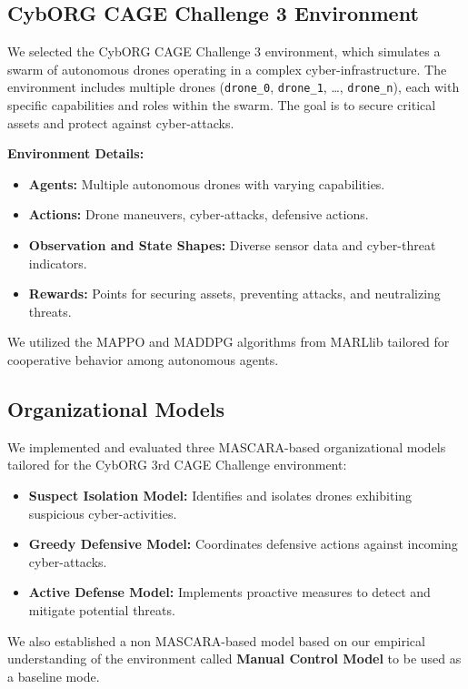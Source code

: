 \documentclass[conference]{IEEEtran}
\begin{document}
\subsection{CybORG CAGE Challenge 3 Environment}

We selected the CybORG CAGE Challenge 3 environment, which simulates a swarm of autonomous drones operating in a complex cyber-infrastructure. The environment includes multiple drones (\texttt{drone\_0}, \texttt{drone\_1}, \ldots, \texttt{drone\_n}), each with specific capabilities and roles within the swarm. The goal is to secure critical assets and protect against cyber-attacks.

\textbf{Environment Details:}
\begin{itemize}
    \item \textbf{Agents:} Multiple autonomous drones with varying capabilities.
    \item \textbf{Actions:} Drone maneuvers, cyber-attacks, defensive actions.
    \item \textbf{Observation and State Shapes:} Diverse sensor data and cyber-threat indicators.
    \item \textbf{Rewards:} Points for securing assets, preventing attacks, and neutralizing threats.
\end{itemize}

We utilized the MAPPO and MADDPG algorithms from MARLlib tailored for cooperative behavior among autonomous agents.

\subsection{Organizational Models}

We implemented and evaluated three MASCARA-based organizational models tailored for the CybORG 3rd CAGE Challenge environment:

\begin{itemize}
    \item \textbf{Suspect Isolation Model:} Identifies and isolates drones exhibiting suspicious cyber-activities.
    \item \textbf{Greedy Defensive Model:} Coordinates defensive actions against incoming cyber-attacks.
    \item \textbf{Active Defense Model:} Implements proactive measures to detect and mitigate potential threats.
\end{itemize}

We also established a non MASCARA-based model based on our empirical understanding of the environment called \textbf{Manual Control Model} to be used as a baseline mode.
\end{document}
